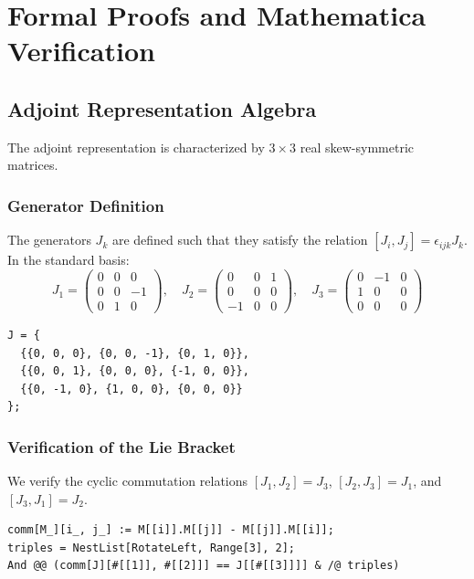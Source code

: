 \chapter{Formal Proofs and Mathematica Verification}

\section{Adjoint Representation Algebra}
The adjoint representation  is characterized by $3\times 3$
real skew-symmetric matrices. 

\subsection{Generator Definition}
The generators $J_k$ are defined such that they satisfy the relation $[J_i,
J_j] = \epsilon_{ijk} J_k$. In the standard basis:
\begin{equation*}
    J_1 = \begin{pmatrix} 0 & 0 & 0 \\ 0 & 0 & -1 \\ 0 & 1 & 0 \end{pmatrix}, \quad
    J_2 = \begin{pmatrix} 0 & 0 & 1 \\ 0 & 0 & 0 \\ -1 & 0 & 0 \end{pmatrix}, \quad
    J_3 = \begin{pmatrix} 0 & -1 & 0 \\ 1 & 0 & 0 \\ 0 & 0 & 0 \end{pmatrix}
\end{equation*}

\begin{Verbatim}[frame=single, label=Mathematica]
J = {
  {{0, 0, 0}, {0, 0, -1}, {0, 1, 0}},
  {{0, 0, 1}, {0, 0, 0}, {-1, 0, 0}},
  {{0, -1, 0}, {1, 0, 0}, {0, 0, 0}}
};
\end{Verbatim}

\subsection{Verification of the Lie Bracket}
We verify the cyclic commutation relations $[J_1, J_2] = J_3$, $[J_2, J_3] = J_1$, and $[J_3, J_1] = J_2$.

\begin{Verbatim}[frame=single, label=Mathematica]
comm[M_][i_, j_] := M[[i]].M[[j]] - M[[j]].M[[i]];
triples = NestList[RotateLeft, Range[3], 2];
And @@ (comm[J][#[[1]], #[[2]]] == J[[#[[3]]]] & /@ triples) 
\end{Verbatim}

